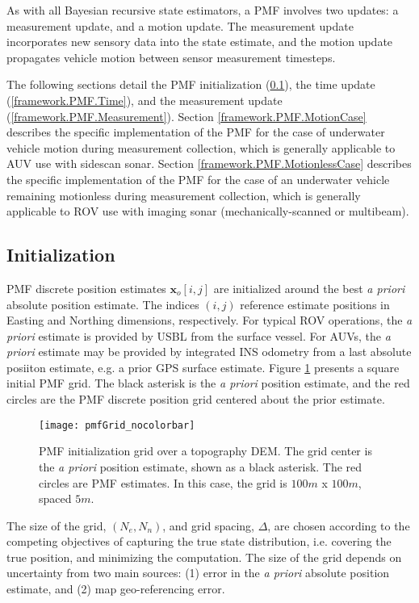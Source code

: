 As with all Bayesian recursive state estimators, a PMF involves two updates: a measurement update, and a motion update.  The measurement update incorporates new sensory data into the state estimate, and the motion update propagates vehicle motion between sensor measurement timesteps.

The following sections detail the PMF initialization (\ref{framework.PMF.Initialization}), the time update (\ref{framework.PMF.Time}), and the measurement update (\ref{framework.PMF.Measurement}).
Section \ref{framework.PMF.MotionCase} describes the specific implementation of the PMF for the case of underwater vehicle motion during measurement collection, which is generally applicable to AUV use with sidescan sonar.
Section \ref{framework.PMF.MotionlessCase} describes the specific implementation of the PMF for the case of an underwater vehicle remaining motionless during measurement collection, which is generally applicable to ROV use with imaging sonar (mechanically-scanned or multibeam).

\subsection{Initialization}
\label{framework.PMF.Initialization}

PMF discrete position estimates $\mathbf{x}_o[i,j]$ are initialized around the best \emph{a priori} absolute position estimate.  
The indices $(i,j)$ reference estimate positions in Easting and Northing dimensions, respectively.
For typical ROV operations, the \emph{a priori} estimate is provided by USBL from the surface vessel.
For AUVs, the \emph{a priori} estimate may be provided by integrated INS odometry from a last absolute posiiton estimate, e.g. a prior GPS surface estimate.
Figure \ref{fig:pmfInit} presents a square initial PMF grid.  The black asterisk is the \emph{a priori} position estimate, and the red circles are the PMF discrete position grid centered about the prior estimate.

\begin{figure}[!h]
	\centering
         \texttt{[image: pmfGrid\_nocolorbar]}
         \caption{PMF initialization grid over a topography DEM. The grid center is the \emph{a priori} position estimate, shown as a black asterisk. The red circles are PMF estimates.  In this case, the grid is $100m$ x $100m$, spaced $5m$.}
	\label{fig:pmfInit}
\end{figure}

The size of the grid, $(N_e, N_n)$, and grid spacing, $\Delta$, are chosen according to the competing objectives of capturing the true state distribution, i.e. covering the true position, and minimizing the computation.
The size of the grid depends on uncertainty from two main sources: (1) error in the \emph{a priori} absolute position estimate, and (2) map geo-referencing error. 

